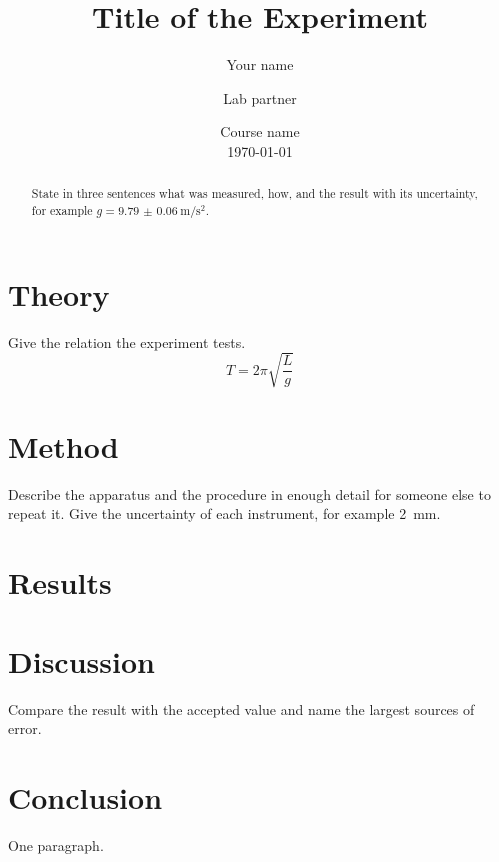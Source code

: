 \documentclass[11pt,a4paper]{article}
\title{Title of the Experiment}
\author{Your name \and Lab partner}
\date{Course name \\ \today}
\begin{document}
\maketitle

\begin{abstract}
State in three sentences what was measured, how, and the result with its uncertainty, for example $g = \SI{9.79(6)}{\metre\per\second\squared}$.
\end{abstract}

\section{Theory}
Give the relation the experiment tests.
\begin{equation}
  T = 2\pi \sqrt{\frac{L}{g}}
\end{equation}

\section{Method}
Describe the apparatus and the procedure in enough detail for someone else to repeat it. Give the uncertainty of each instrument, for example \SI{2}{\milli\metre}.

\section{Results}


\section{Discussion}
Compare the result with the accepted value and name the largest sources of error.

\section{Conclusion}
One paragraph.
\end{document}
